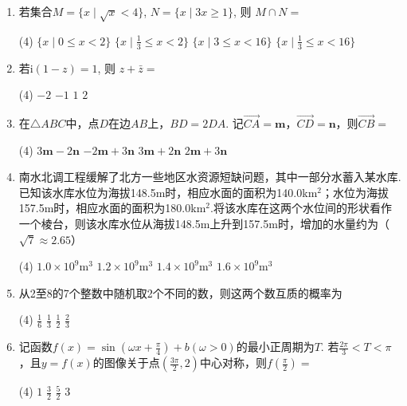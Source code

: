 \documentclass[11pt,space]{ctexart} %
\begin{document}
\begin{enumerate}[itemsep=0.3em,topsep=0pt]
	\item  若集合$ M=\{x\mid\sqrt{x}<4\}$,  $N=\{x\mid 3x\geqslant 1\} $, 则  $M \cap N=$
	\begin{tasks}(4)
	\task $\{x\mid 0\leqslant x < 2\}$   \task $\{x\mid \frac{1}{3} \leqslant x < 2\}$   
	\task $\{x\mid 3 \leqslant x < 16\}$ \task $\{x\mid \frac{1}{3} \leqslant x < 16\}$
	\end{tasks}
	
	\item  若$\mathrm{i}(1-z)=1$, 则  $z+\bar{z}=$
	\begin{tasks}(4)
	\task $-2$ \task $-1$ \task $1$ \task $2$
	\end{tasks}
	
	\item  在$\triangle ABC$中，点$D$在边$AB$上，$BD=2DA$. 记$\overrightarrow{CA} = \bm{m}$，$\overrightarrow{CD} = \bm{n}$，则$\overrightarrow{CB}=$
	\begin{tasks}(4)
	\task $3\bm{m}-2\bm{n}$ \task $-2\bm{m}+3\bm{n}$ \task $3\bm{m}+2\bm{n}$ \task $2\bm{m}+3\bm{n}$
	\end{tasks}
	
	\item  南水北调工程缓解了北方一些地区水资源短缺问题，其中一部分水蓄入某水库. 已知该水库水位为海拔148.5m时，相应水面的面积为140.0km$^2$；水位为海拔157.5m时，相应水面的面积为180.0km$^2$.将该水库在这两个水位间的形状看作一个棱台，则该水库水位从海拔148.5m上升到157.5m时，增加的水量约为（$\sqrt{7}\approx 2.65$）
	\begin{tasks}(4)
	\task $1.0\times 10^9 \mathrm{m}^3$ \task $1.2\times 10^9 \mathrm{m}^3$ \task $1.4\times 10^9 \mathrm{m}^3$ \task $1.6\times 10^9 \mathrm{m}^3$
	\end{tasks}

	\item  从2至8的7个整数中随机取2个不同的数，则这两个数互质的概率为
	\begin{tasks}(4)
	\task $\frac{1}{6}$ \task $\frac{1}{3}$ \task $\frac{1}{2}$ \task $\frac{2}{3}$
	\end{tasks}

	\item  记函数$f(x)=\sin\left( \omega x+\frac{\pi}{4}\right)+b(\omega >0)$的最小正周期为$T$. 若$\frac{2\pi}{3}<T<\pi$，且$y=f(x)$的图像关于点$\left(\frac{3\pi}{2},2\right)$中心对称，则$f\left(\frac{\pi}{2}\right) = $
	\begin{tasks}(4)
	\task $1$ \task $\frac{3}{2} $ \task $\displaystyle\frac{5}{2}  $ \task $3$
	\end{tasks}


\end{enumerate}
\end{document}
